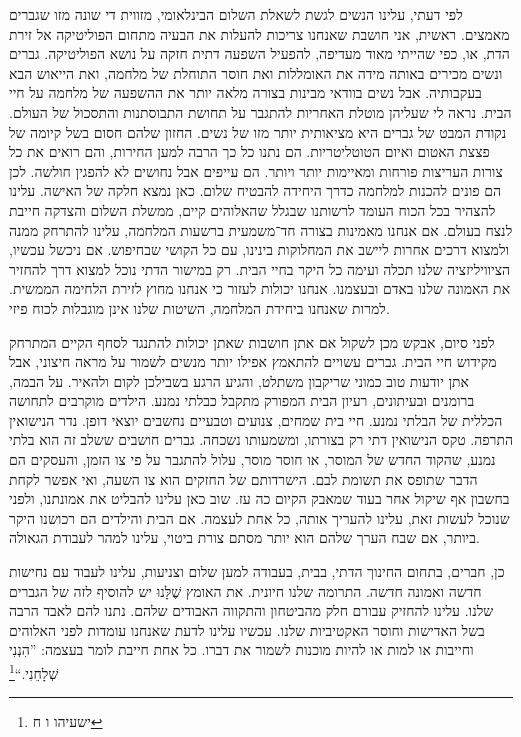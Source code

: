 \documentclass[14pt, article, extrafontsizes, twopage, a4paper]{memoir}
\begin{document}
לפי דעתי, עלינו הנשים לגשת לשאלת השלום הבינלאומי, מזווית די שונה מזו
שגברים מאמצים. ראשית, אני חושבת שאנחנו צריכות להעלות
את הבעיה מתחום הפוליטיקה אל זירת
הדת, או, כפי שהייתי מאוד מעדיפה, להפעיל
השפעה דתית חזקה על נושא הפוליטיקה. גברים
ונשים מכירים באותה מידה את האומללות ואת
חוסר התוחלת של מלחמה, ואת הייאוש הבא בעקבותיה.
אבל נשים בוודאי מבינות בצורה מלאה יותר את ההשפעה
של מלחמה על חיי הבית. נראה לי שעליהן מוטלת האחריות
להתגבר על תחושת התבוסתנות והתסכול של העולם. נקודת המבט של גברים היא
מציאותית יותר מזו של נשים. החזון שלהם
חסום בשל קיומה של פצצת האטום ואיום
הטוטליטריות. הם נתנו כל כך הרבה למען
החירות, והם רואים את כל צורות העריצות פורחות
ומאיימות יותר ויותר. הם עייפים אבל
נחושים לא להפגין חולשה. לכן הם פונים להכנות למלחמה
כדרך היחידה להבטיח שלום. כאן נמצא
חלקה של האישה. עלינו להצהיר בכל הכוח
העומד לרשותנו שבגלל שהאלוהים קיים, ממשלת השלום
והצדקה חייבת לנצח בעולם. אם אנחנו מאמינות בצורה חד־משמעית
ברשעות המלחמה, עלינו להתרחק ממנה
ולמצוא דרכים אחרות ליישב את המחלוקות בינינו,
עם כל הקושי שבחיפוש. אם ניכשל עכשיו, הציוויליזציה שלנו
תכלה ועימה כל היקר בחיי הבית.
רק במישור הדתי נוכל למצוא
דרך להחזיר את האמונה שלנו באדם ובעצמנו. אנחנו
יכולות לעזור כי אנחנו מחוץ לזירת הלחימה הממשית.
למרות שאנחנו ביחידת המלחמה, השיטות שלנו אינן
מוגבלות לכוח פיזי.

לפני סיום, אבקש מכן לשקול אם
אתן חושבות שאתן יכולות להתנגד לסחף הקיים המתרחק מקידוש חיי הבית. גברים עשויים להתאמץ אפילו יותר
מנשים לשמור על מראה חיצוני, אבל אתן יודעות טוב כמוני
שריקבון משתלט, והגיע הרגע
בשבילכן לקום ולהאיר. על הבמה,
ברומנים ובעיתונים, רעיון הבית המפורק
מתקבל כבלתי נמנע. הילדים מוקרבים
לתחושה הכללית של הבלתי נמנע.
חיי בית שמחים, צנועים וטבעיים נחשבים
יוצאי דופן. נדר הנישואין התרפה.
טקס הנישואין דתי רק בצורתו,
ומשמעותו נשכחה. גברים חושבים
ששלב זה הוא בלתי נמנע, שהקוד החדש של המוסר, או
חוסר מוסר, עלול להתגבר על פי צו הזמן, והעסקים הם הדבר שתופס את תשומת לבם. הישרדותם של החזקים
הוא צו השעה, ואי אפשר לקחת בחשבון אף שיקול אחר
בעוד שמאבק הקיום כה עז. שוב כאן
עלינו להבליט את אמונתנו, ולפני שנוכל לעשות זאת, עלינו להעריך אותה,
כל אחת לעצמה. אם הבית והילדים
הם רכושנו היקר ביותר, אם שבח
הערך שלהם הוא יותר מסתם צורת ביטוי, עלינו
למהר לעבודת הגאולה.

כן, חברים, בתחום החינוך הדתי, בבית,
בעבודה למען שלום וצניעות, עלינו לעבוד עם
נחישות חדשה ואמונה חדשה. התרומה שלנו חיונית. את האומץ שֶׁלָּנוּ
יש להוסיף לזה של הגברים שלנו. עלינו להחזיק
עבורם חלק מהביטחון והתקווה האבודים שלהם. נתנו
להם לאבד הרבה בשל האדישות וחוסר האקטיביות שלנו. עכשיו עלינו
לדעת שאנחנו עומדות לפני האלוהים וחייבות או למות
או להיות מוכנות לשמור את דברו. כל אחת חייבת לומר
בעצמה: ”הִנְנִי שְׁלָחֵנִי.“\footnote{ישעיהו ו ח}
\end{document}
